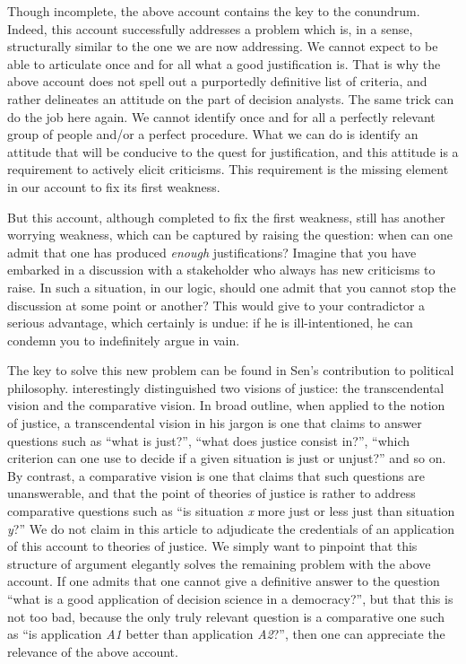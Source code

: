 \documentclass[preprint, french, english, 11pt, authoryear]{elsarticle}%
\begin{document}
Though incomplete, the above account contains the key to the conundrum. Indeed, this account successfully addresses a problem which is, in a sense, structurally similar to the one we are now addressing. We cannot expect to be able to articulate once and for all what a good justification is. That is why the above account does not spell out a purportedly definitive list of criteria, and rather delineates an attitude on the part of decision analysts. The same trick can do the job here again. We cannot identify once and for all a perfectly relevant group of people and/or a perfect procedure. What we can do is identify an attitude that will be conducive to the quest for justification, and this attitude is a requirement to actively elicit criticisms. This requirement is the missing element in our account to fix its first weakness.

But this account, although completed to fix the first weakness, still has another worrying weakness, which can be captured by raising the question: when can one admit that one has produced \emph{enough} justifications? Imagine that you have embarked in a discussion with a stakeholder who always has new criticisms to raise. In such a situation, in our logic, should one admit that you cannot stop the discussion at some point or another? This would give to your contradictor a serious advantage, which certainly is undue: if he is ill-intentioned, he can condemn you to indefinitely argue in vain.

The key to solve this new problem can be found in Sen's contribution to political philosophy. \cite{sen_idea_2009} interestingly distinguished two visions of justice: the transcendental vision and the comparative vision. In broad outline, when applied to the notion of justice, a transcendental vision in his jargon is one that claims to answer questions such as ``what is just?'', ``what does justice consist in?'', ``which criterion can one use to decide if a given situation is just or unjust?'' and so on. By contrast, a comparative vision is one that claims that such questions are unanswerable, and that the point of theories of justice is rather to address comparative questions such as ``is situation \emph{x} more just or less just than situation \emph{y}?'' We do not claim in this article to adjudicate the credentials of an application of this account to theories of justice. We simply want to pinpoint that this structure of argument elegantly solves the remaining problem with the above account. If one admits that one cannot give a definitive answer to the question ``what is a good application of decision science in a democracy?'', but that this is not too bad, because the only truly relevant question is a comparative one such as ``is application \emph{A1} better than application \emph{A2}?'', then one can appreciate the relevance of the above account.
\end{document}
